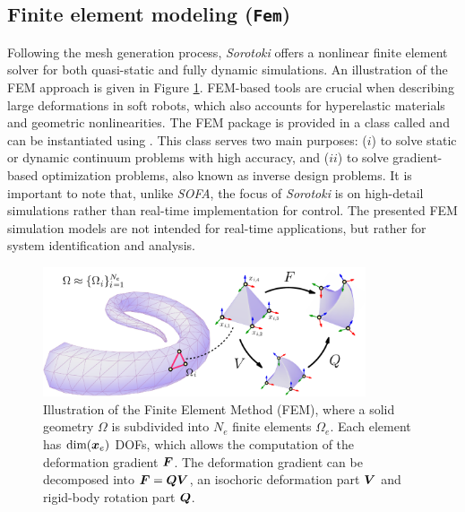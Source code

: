 \subsection{Finite element modeling (\texttt{Fem})}
\label{sec:C5:fem}
Following the mesh generation process, \textit{Sorotoki} offers a nonlinear finite element solver for both quasi-static and fully dynamic simulations. An illustration of the FEM approach is given in Figure \ref{fig:C5:illustration_FEM}. FEM-based tools are crucial when describing large deformations in soft robots, which also accounts for hyperelastic materials and geometric nonlinearities. The FEM package is provided in a class called  and can be instantiated using . This class serves two main purposes: ($i$) to solve static or dynamic continuum problems with high accuracy, and ($ii$) to solve gradient-based optimization problems, also known as inverse design problems. It is important to note that, unlike \textit{SOFA}, the focus of \textit{Sorotoki} is on high-detail simulations rather than real-time implementation for control. The presented FEM simulation models are not intended for real-time applications, but rather for system identification and analysis.

\begin{figure}
\centering
\includegraphics[width=0.85\textwidth]{./pdf/FemExample.pdf}
\caption{Illustration of the Finite Element Method (FEM), where a solid geometry $\Omega$ is subdivided into $N_e$ finite elements $\Omega_e$. Each element has $\text{dim}({\boldsymbol{x}}_e)$ DOFs, which allows the computation of the deformation gradient ${\boldsymbol{F}}$. The deformation gradient can be decomposed into ${\boldsymbol{F}} = {\boldsymbol{Q}}{\boldsymbol{V}}$, an isochoric deformation part ${\boldsymbol{V}}$ and rigid-body rotation part ${\boldsymbol{Q}}$. }    
\label{fig:C5:illustration_FEM}
\end{figure}

